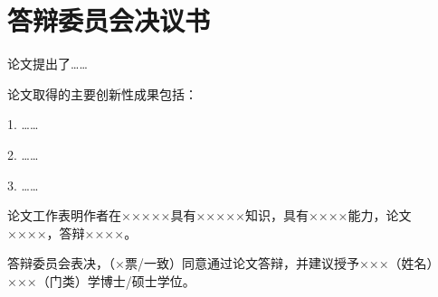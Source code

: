 
\chapter{答辩委员会决议书}

论文提出了……

论文取得的主要创新性成果包括：

1. ……

2. ……

3. ……

论文工作表明作者在×××××具有×××××知识，具有××××能力，论文××××，答辩××××。

答辩委员会表决，（×票/一致）同意通过论文答辩，并建议授予×××（姓名）×××（门类）学博士/硕士学位。

